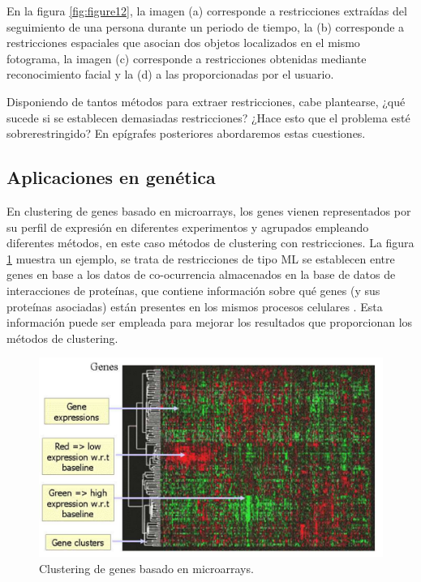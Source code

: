 En la figura \ref{fig:figure12}, la imagen (a) corresponde a restricciones extraídas del seguimiento de una persona durante un periodo de tiempo, la (b) corresponde a restricciones espaciales que asocian dos objetos localizados en el mismo fotograma, la imagen (c) corresponde a restricciones obtenidas mediante reconocimiento facial y la (d) a las proporcionadas por el usuario.

Disponiendo de tantos métodos para extraer restricciones, cabe plantearse, ¿qué sucede si se establecen demasiadas restricciones? ¿Hace esto que el problema esté sobrerestringido? En epígrafes posteriores abordaremos estas cuestiones.

\subsection{Aplicaciones en genética}

En clustering de genes basado en microarrays, los genes vienen representados por su perfil de expresión en diferentes experimentos y agrupados empleando diferentes métodos, en este caso métodos de clustering con restricciones. La  figura \ref{fig:figure13} muestra un ejemplo, se trata de restricciones de tipo \acf{ML} se establecen entre genes en base a los datos de co-ocurrencia almacenados en la base de datos de interacciones de proteínas, que contiene información sobre qué genes (y sus proteínas asociadas) están presentes en los mismos procesos celulares \cite{Xenarios:2001}. Esta información puede ser empleada para mejorar los resultados que proporcionan los métodos de clustering. \cite{Seagal:2003}

\begin{figure}[!h]
	\centering
	\includegraphics[scale=0.3]{imagenes/c3/Genetica/Genes} 
	\caption{Clustering de genes basado en microarrays. \cite{Survey:2007}}\label{fig:figure13}
\end{figure}


